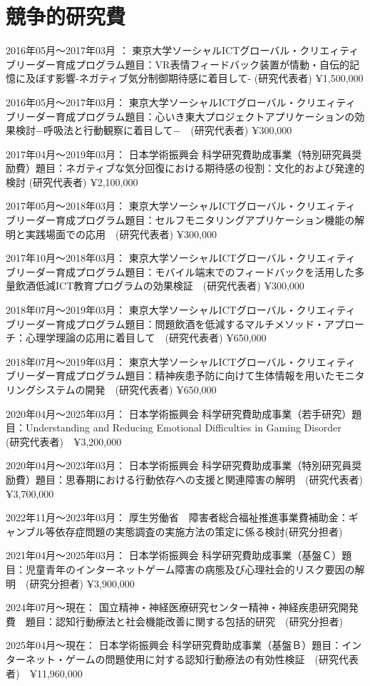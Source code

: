\documentclass[11pt,a4paper]{article}
\begin{document}
\section{競争的研究費}
\begin{description}
	\item 2016年05月〜2017年03月	： 東京大学ソーシャルICTグローバル・クリエィティブリーダー育成プログラム題目：VR表情フィードバック装置が情動・自伝的記憶に及ぼす影響-ネガティブ気分制御期待感に着目して- (研究代表者) ¥1,500,000
	\item 2016年05月〜2017年03月： 東京大学ソーシャルICTグローバル・クリエィティブリーダー育成プログラム題目：心いき東大プロジェクトアプリケーションの効果検討−呼吸法と行動観察に着目して−　(研究代表者) ¥300,000
	\item 2017年04月〜2019年03月： 日本学術振興会 科学研究費助成事業（特別研究員奨励費）題目：ネガティブな気分回復における期待感の役割：文化的および発達的検討 (研究代表者) ¥2,100,000
	\item 2017年05月〜2018年03月： 東京大学ソーシャルICTグローバル・クリエィティブリーダー育成プログラム題目：セルフモニタリングアプリケーション機能の解明と実践場面での応用　(研究代表者) ¥300,000
	\item 2017年10月〜2018年03月： 東京大学ソーシャルICTグローバル・クリエィティブリーダー育成プログラム題目：モバイル端末でのフィードバックを活用した多量飲酒低減ICT教育プログラムの効果検証　(研究代表者) ¥300,000
	\item 2018年07月〜2019年03月： 東京大学ソーシャルICTグローバル・クリエィティブリーダー育成プログラム題目：問題飲酒を低減するマルチメソッド・アプローチ：心理学理論の応用に着目して　(研究代表者) ¥650,000
	\item 2018年07月〜2019年03月： 東京大学ソーシャルICTグローバル・クリエィティブリーダー育成プログラム題目：精神疾患予防に向けて生体情報を用いたモニタリングシステムの開発　(研究代表者) ¥650,000
	\item 2020年04月〜2025年03月： 日本学術振興会 科学研究費助成事業（若手研究）題目：Understanding and Reducing Emotional Difficulties in Gaming Disorder　(研究代表者)　¥3,200,000
	\item 2020年04月〜2023年03月： 日本学術振興会 科学研究費助成事業（特別研究員奨励費）題目：思春期における行動依存への支援と関連障害の解明　(研究代表者) ¥3,700,000
	\item 2022年11月〜2023年03月： 厚生労働省　障害者総合福祉推進事業費補助金：ギャンブル等依存症問題の実態調査の実施方法の策定に係る検討(研究分担者)
	\item 2021年04月〜2025年03月： 日本学術振興会 科学研究費助成事業（基盤Ｃ）題目：児童青年のインターネットゲーム障害の病態及び心理社会的リスク要因の解明　(研究分担者) ¥3,900,000
	\item 2024年07月〜現在： 国立精神・神経医療研究センター精神・神経疾患研究開発費　題目：認知行動療法と社会機能改善に関する包括的研究　(研究分担者)
	\item 2025年04月〜現在： 日本学術振興会 科学研究費助成事業（基盤Ｂ）題目：インターネット・ゲームの問題使用に対する認知行動療法の有効性検証　(研究代表者)　¥11,960,000
\end{description}
\end{document}

